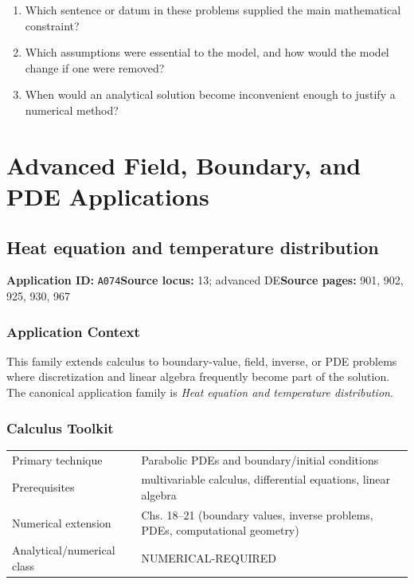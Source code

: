 \documentclass[11pt]{book}
\newcommand{\pid}[1]{\texttt{#1}}
\begin{document}
\begin{reflectionbox}\begin{enumerate}
\item Which sentence or datum in these problems supplied the main mathematical constraint?
\item Which assumptions were essential to the model, and how would the model change if one were removed?
\item When would an analytical solution become inconvenient enough to justify a numerical method?
\end{enumerate}\end{reflectionbox}
\part{Advanced Field, Boundary, and PDE Applications}
\chapter{Heat equation and temperature distribution}\label{app:A074}
\textbf{Application ID:} \pid{A074}\quad \textbf{Source locus:} 13; advanced DE\quad \textbf{Source pages:} 901, 902, 925, 930, 967
\section*{Application Context}
This family extends calculus to boundary-value, field, inverse, or PDE problems where discretization and linear algebra frequently become part of the solution. The canonical application family is \emph{Heat equation and temperature distribution}.
\section*{Calculus Toolkit}
\begin{tabularx}{\textwidth}{@{}lX@{}}\toprule
Primary technique & Parabolic PDEs and boundary/initial conditions \\
Prerequisites & multivariable calculus, differential equations, linear algebra \\
Numerical extension & Chs. 18–21 (boundary values, inverse problems, PDEs, computational geometry) \\
Analytical/numerical class & NUMERICAL-REQUIRED \\
\bottomrule\end{tabularx}
\end{document}
